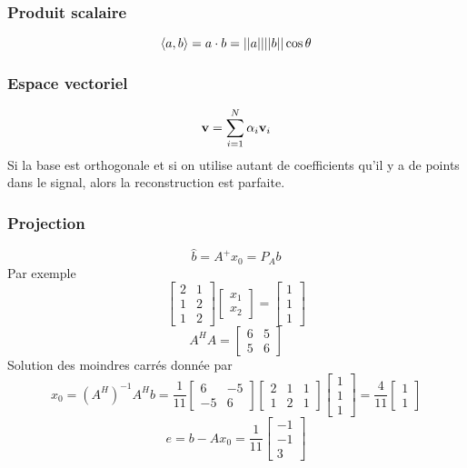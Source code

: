 \documentclass[resume]{subfiles}
\begin{document}
\subsubsection{Produit scalaire}
$$\langle a,b \rangle = a\cdot b=\abs{\abs{a}}\abs{\abs{b}}\cos\theta$$
\subsubsection{Espace vectoriel}
$$\bold{v}=\sum_{i=1}^{N}\alpha_i\bold{v}_i$$
Si la base est orthogonale et si on utilise autant de coefficients qu'il y a de points dans le signal, alors la reconstruction est parfaite.
\subsubsection{Projection}
$$\hat{b}=A^{+}x_0=P_Ab$$
Par exemple
$$\begin{bmatrix}
2 & 1\\
1 & 2\\
1 & 2
\end{bmatrix}\begin{bmatrix}
x_1\\x_2
\end{bmatrix}=\begin{bmatrix}
1\\1\\1
\end{bmatrix}$$
$$A^{H}A=\begin{bmatrix}
6 & 5\\5 & 6
\end{bmatrix}$$
Solution des moindres carrés donnée par
$$x_0=(A^{H})^{-1}A^{H}b=\frac{1}{11}\begin{bmatrix}
6 & -5\\-5 & 6
\end{bmatrix}\begin{bmatrix}
2 & 1 & 1\\
1 & 2 & 1
\end{bmatrix}\begin{bmatrix}
1\\1\\1
\end{bmatrix}=\frac{4}{11}\begin{bmatrix}
1\\1
\end{bmatrix}$$
$$e=b-Ax_0=\frac{1}{11}\begin{bmatrix}
-1\\-1\\3
\end{bmatrix}$$
\end{document}
